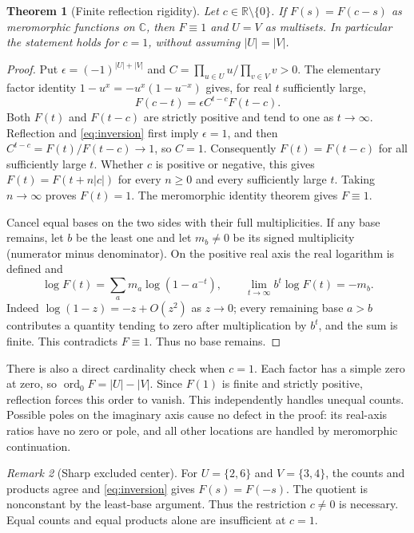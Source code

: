 \documentclass[11pt]{article}
\newtheorem{theorem}{Theorem}
\theoremstyle{remark}\newtheorem{remark}[theorem]{Remark}
\newcommand{\R}{\mathbb R}\newcommand{\C}{\mathbb C}
\begin{document}
\begin{theorem}[Finite reflection rigidity]\label{thm:finite}
Let $c\in\R\setminus\{0\}$. If $F(s)=F(c-s)$ as meromorphic functions on
$\C$, then $F\equiv1$ and $U=V$ as multisets. In particular the statement
holds for $c=1$, without assuming $|U|=|V|$.
\end{theorem}
\begin{proof}
Put $\epsilon=(-1)^{|U|+|V|}$ and
$C=\prod_{u\in U}u/\prod_{v\in V}v>0$. The elementary factor identity
$1-u^x=-u^x(1-u^{-x})$ gives, for real $t$ sufficiently large,
\begin{equation}\label{eq:inversion}
 F(c-t)=\epsilon C^{t-c}F(t-c).
\end{equation}
Both $F(t)$ and $F(t-c)$ are strictly positive and tend to one as
$t\to\infty$. Reflection and \eqref{eq:inversion} first imply
$\epsilon=1$, and then
$C^{t-c}=F(t)/F(t-c)\to1$, so $C=1$. Consequently $F(t)=F(t-c)$ for
all sufficiently large $t$. Whether $c$ is positive or negative, this gives
$F(t)=F(t+n|c|)$ for every $n\geq0$ and every sufficiently large $t$.
Taking $n\to\infty$ proves $F(t)=1$. The meromorphic identity theorem
gives $F\equiv1$.

Cancel equal bases on the two sides with their full multiplicities. If any
base remains, let $b$ be the least one and let $m_b\ne0$ be its signed
multiplicity (numerator minus denominator). On the positive real axis the
real logarithm is defined and
\[
 \log F(t)=\sum_a m_a\log(1-a^{-t}),\qquad
 \lim_{t\to\infty}b^t\log F(t)=-m_b.
\]
Indeed $\log(1-z)=-z+O(z^2)$ as $z\to0$; every remaining base $a>b$
contributes a quantity tending to zero after multiplication by $b^t$, and
the sum is finite. This contradicts $F\equiv1$. Thus no base remains.
\end{proof}

There is also a direct cardinality check when $c=1$. Each factor has a
simple zero at zero, so $\operatorname{ord}_0F=|U|-|V|$. Since $F(1)$ is
finite and strictly positive, reflection forces this order to vanish.
This independently handles unequal counts. Possible poles on the imaginary
axis cause no defect in the proof: its real-axis ratios have no zero or pole,
and all other locations are handled by meromorphic continuation.

\begin{remark}[Sharp excluded center]
For $U=\{2,6\}$ and $V=\{3,4\}$, the counts and products agree and
\eqref{eq:inversion} gives $F(s)=F(-s)$. The quotient is nonconstant by the
least-base argument. Thus the restriction $c\ne0$ is necessary. Equal
counts and equal products alone are insufficient at $c=1$.
\end{remark}
\end{document}
